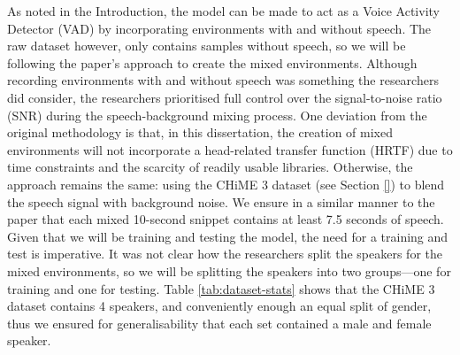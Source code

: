\documentclass[logo,bsc,singlespacing,parskip,online]{infthesis}
\begin{document}
As noted in the Introduction, the model can be made to act as a Voice Activity Detector (VAD) by incorporating environments with and without speech.
The raw dataset however, only contains samples without speech, so we will be following the paper's approach to create the mixed environments.
Although recording environments with and without speech was something the researchers did consider, the researchers prioritised full control over the signal-to-noise ratio (SNR) during the speech-background mixing process.
One deviation from the original methodology is that, in this dissertation, the creation of mixed environments will not incorporate a head-related transfer function (HRTF) due to time constraints and the scarcity of readily usable libraries.
Otherwise, the approach remains the same: using the CHiME 3 dataset (see Section \ref{}) to blend the speech signal with background noise.
We ensure in a similar manner to the paper that each mixed 10-second snippet contains at least 7.5 seconds of speech.
Given that we will be training and testing the model, the need for a training and test is imperative. 
It was not clear how the researchers split the speakers for the mixed environments, so we will be splitting the speakers into two groups—one for training and one for testing.
Table \ref{tab:dataset-stats} shows that the CHiME 3 dataset contains 4 speakers, and conveniently enough an equal split of gender,
thus we ensured for generalisability that each set contained a male and female speaker. 
\end{document}
